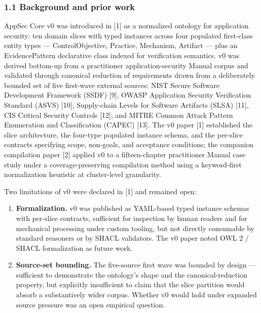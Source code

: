 \documentclass[
]{article}
\providecommand{\tightlist}{%
  \setlength{\itemsep}{0pt}\setlength{\parskip}{0pt}}
\begin{document}
\subsubsection{1.1 Background and prior
work}\label{background-and-prior-work}

AppSec Core v0 was introduced in {[}1{]} as a normalized ontology for
application security: ten domain slices with typed instances across four
populated first-class entity types --- ControlObjective, Practice,
Mechanism, Artifact --- plus an EvidencePattern declarative class
indexed for verification semantics. v0 was derived bottom-up from a
practitioner application-security Manual corpus and validated through
canonical reduction of requirements drawn from a deliberately bounded
set of five first-wave external sources: NIST Secure Software
Development Framework (SSDF) {[}9{]}, OWASP Application Security
Verification Standard (ASVS) {[}10{]}, Supply-chain Levels for Software
Artifacts (SLSA) {[}11{]}, CIS Critical Security Controls {[}12{]}, and
MITRE Common Attack Pattern Enumeration and Classification (CAPEC)
{[}13{]}. The v0 paper {[}1{]} established the slice architecture, the
four-type populated instance schema, and the per-slice contracts
specifying scope, non-goals, and acceptance conditions; the companion
compilation paper {[}2{]} applied v0 to a fifteen-chapter practitioner
Manual case study under a coverage-preserving compilation method using a
keyword-first normalization heuristic at cluster-level granularity.

Two limitations of v0 were declared in {[}1{]} and remained open:

\begin{enumerate}
\def\labelenumi{\arabic{enumi}.}
\tightlist
\item
  \textbf{Formalization.} v0 was published as YAML-based typed instance
  schemas with per-slice contracts, sufficient for inspection by human
  readers and for mechanical processing under custom tooling, but not
  directly consumable by standard reasoners or by SHACL validators. The
  v0 paper noted OWL 2 / SHACL formalization as future work.
\item
  \textbf{Source-set bounding.} The five-source first wave was bounded
  by design --- sufficient to demonstrate the ontology's shape and the
  canonical-reduction property, but explicitly insufficient to claim
  that the slice partition would absorb a substantively wider corpus.
  Whether v0 would hold under expanded source pressure was an open
  empirical question.
\end{enumerate}
\end{document}
